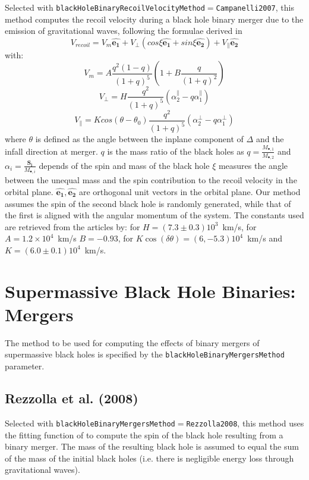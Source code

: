 Selected with {\tt blackHoleBinaryRecoilVelocityMethod}$=${\tt Campanelli2007}, this method computes the recoil velocity during a black hole binary merger due to the emission of gravitational waves, following the formulae derived in \cite {campanelli_large_2007}
\begin{equation}
V_{recoil}=V_m\mathbf{\hat{e_1}}+V_\perp(cos\xi\mathbf{\hat{e_1}}+sin\xi\mathbf{\hat{e_2}})+V_\parallel\mathbf{\hat{e_2}} 
\end{equation}
with:
\begin{equation}
V_m=A\frac{q^2(1-q)}{(1+q)^5}(1+B\frac{q}{(1+q)^2})
\end{equation}
\begin{equation}
V_\perp=H\frac{q^2}{(1+q)^5}(\alpha^\parallel_2-q\alpha^\parallel_1)
\end{equation}
\begin{equation}
V_\parallel=Kcos(\theta-\theta_0)\frac{q^2}{(1+q)^5}(\alpha^\perp_2-q\alpha^\perp_1)
\end{equation}
where $\theta$ is defined as the angle between the inplane \gls{component} of $\Delta$ and the infall direction at merger. $q$ is the mass ratio of the black holes as $q=\frac{M_{\bullet,1}}{M_{\bullet,2}}$ and $\alpha_i=\frac{\mathbf{S_i}}{M_{\bullet,i}}$ depends of the spin and mass of the black hole $\xi$ measures the angle between the unequal mass and the spin contribution to the recoil velocity in the orbital plane. $\mathbf{\hat{e_1}} , \mathbf{\hat{e_2}}$ are orthogonal unit vectors in the orbital plane. Our method assumes the spin of the second black hole is randomly generated, while that of the first is aligned with the angular momentum of the system. The constants used are retrieved from the articles by: \cite{koppitz_recoil_2007} for $H=(7.3\pm 0.3)10^3$~km/s, \cite{gonzalez_maximum_2007} for $A=1.2 \times 10^4$~km/s $B=-0.93$, \cite{gonzalez_supermassive_2007} for $K\cos(\delta\theta)=(6,-5.3)10^4$~km/s and $K=(6.0\pm 0.1)10^4$~km/s.

\section{Supermassive Black Hole Binaries: Mergers}

The method to be used for computing the effects of binary mergers of supermassive black holes is specified by the {\tt blackHoleBinaryMergersMethod} parameter.

\subsection{Rezzolla et al. (2008)}

Selected with {\tt blackHoleBinaryMergersMethod}$=${\tt Rezzolla2008}, this method uses the fitting function of \cite{rezzolla_final_2008} to compute the spin of the black hole resulting from a binary merger. The mass of the resulting black hole is assumed to equal the sum of the mass of the initial black holes (i.e. there is negligible energy loss through gravitational waves).

